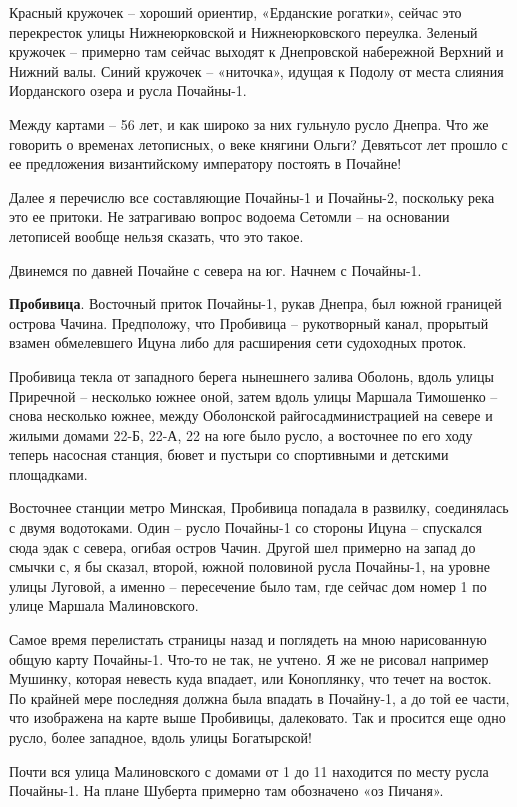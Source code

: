 Красный кружочек – хороший ориентир, «Ерданские рогатки», сейчас это перекресток улицы Нижнеюрковской и Нижнеюрковского переулка. Зеленый кружочек – примерно там сейчас выходят к Днепровской набережной Верхний и Нижний валы. Синий кружочек – «ниточка», идущая к Подолу от места слияния Иорданского озера и русла Почайны-1.
 
Между картами – 56 лет, и как широко за них гульнуло русло Днепра. Что же говорить о временах летописных, о веке княгини Ольги? Девятьсот лет прошло с ее предложения византийскому императору постоять в Почайне!

Далее я перечислю все составляющие Почайны-1 и Почайны-2, поскольку река это ее притоки. Не затрагиваю вопрос водоема Сетомли – на основании летописей вообще нельзя сказать, что это такое.

Двинемся по давней Почайне с севера на юг. Начнем с Почайны-1.




\textbf{Пробивица}. Восточный приток Почайны-1, рукав Днепра, был южной границей острова Чачина. Предположу, что Пробивица – рукотворный канал, прорытый взамен обмелевшего Ицуна либо для расширения сети судоходных проток.

Пробивица текла от западного берега нынешнего залива Оболонь, вдоль улицы Приречной – несколько южнее оной, затем вдоль улицы Маршала Тимошенко – снова несколько южнее, между Оболонской райгосадминистрацией на севере и жилыми домами 22-Б, 22-А, 22 на юге было русло, а восточнее по его ходу теперь насосная станция, бювет и пустыри со спортивными и детскими площадками.

Восточнее станции метро Минская, Пробивица попадала в развилку, соединялась с двумя водотоками. Один – русло Почайны-1 со стороны Ицуна – спускался сюда эдак с севера, огибая остров Чачин. Другой шел примерно на запад до смычки с, я бы сказал, второй, южной половиной русла Почайны-1, на уровне улицы Луговой, а именно – пересечение было там, где сейчас дом номер 1 по улице Маршала Малиновского.

Самое время перелистать страницы назад и поглядеть на мною нарисованную общую карту Почайны-1. Что-то не так, не учтено. Я же не рисовал например Мушинку, которая невесть куда впадает, или Коноплянку, что течет на восток. По крайней мере последняя должна была впадать в Почайну-1, а до той ее части, что изображена на карте выше Пробивицы, далековато. Так и просится еще одно русло, более западное, вдоль улицы Богатырской!

Почти вся улица Малиновского с домами от 1 до 11 находится по месту русла Почайны-1. На плане Шуберта примерно там обозначено «оз Пичаня».

